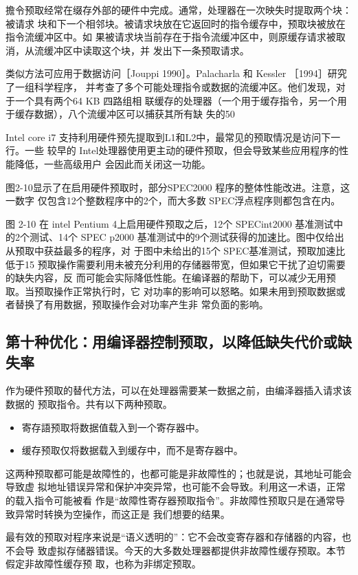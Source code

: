 擔令预取经常在缀存外部的硬件中完成。通常，处理器在一次映失时提取两个块：被请求
块和下一个相邻块。被请求块放在它返回时的指令缓存中，预取块被放在指令流缓冲区中。如
果被请求块当前存在于指令流缓冲区中，则原缓存请求被取消，从流缓冲区中读取这个块，并
发出下一条预取请求。

类似方法可应用于数据访问［Jouppi 1990］。Palacharla 和 Kessler ［1994］研究了一组科学程序，
并考查了多个可能处理指令或数据的流缓冲区。他们发现，对于一个具有两个64 KB 四路组相
联缓存的处理器（一个用于缓存指令，另一个用于缓存数据），八个流缓冲区可以捕获其所有缺
失的50%

Intel core i7 支持利用硬件预先提取到L1和L2中，最常见的预取情况是访问下一行。一些
较早的 Intel处理器使用更主动的硬件预取，但会导致某些应用程序的性能降低，一些高级用户
会因此而关闭这一功能。

图2-10显示了在启用硬件预取时，部分SPEC2000 程序的整体性能改进。注意，这一数字
仅包含12个整数程序中的2个，而大多数 SPEC浮点程序则都包含在内。

图 2-10
在 intel Pentium 4上启用硬件预取之后，12个 SPECint2000 基准测试中的2个测试、14个
SPEC p2000 基准测试中的9个测试获得的加速比。图中仅给出从预取中获益最多的程序，对
于图中未给出的15个 SPEC基准测试，预取加速比低于15%
预取操作需要利用未被充分利用的存储器带宽，但如果它干扰了迫切需要的缺失内容，反
而可能会实际降低性能。在编译器的帮助下，可以减少无用预取。当预取操作正常执行时，它
对功率的影响可以怒略。如果未用到预取数据或者替换了有用数据，预取操作会对功率产生非
常负面的影响。

\subsection{第十种优化：用编译器控制预取，以降低缺失代价或缺失率}
作为硬件预取的替代方法，可以在处理器需要某一数据之前，由编泽器插入请求该数据的
预取指令。共有以下两种预取。

\begin{itemize}
    \item 寄存語预取将数据值载入到一个寄存器中。
    \item 缓存预取仅将数据载入到缓存中，而不是寄存器中。
\end{itemize}

这两种预取都可能是故障性的，也都可能是非故障性的；也就是说，其地址可能会导致虚
拟地址错误异常和保护冲突异常，也可能不会导致。利用这一术语，正常的载入指令可能被看
作是“故障性寄存器预取指令”。非故障性预取只是在通常导致异常时转换为空操作，而这正是
我们想要的结果。

最有效的预取对程序来说是“语义透明的”：它不会改变寄存器和存储器的内容，也不会导
致虚拟存储器错误。今天的大多数处理器都提供非故障性缓存预取。本节假定非故障性缓存预
取，也称为非绑定预取。

